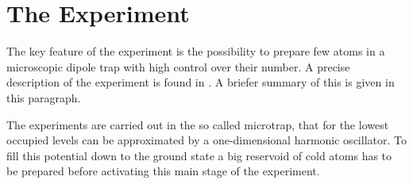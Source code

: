 \chapter{The Experiment}


The key feature of the experiment is the possibility to prepare few atoms in a microscopic dipole trap with high control over their number. A precise description of the experiment is found in \cite{friedhelm}. A briefer summary of this is given in this paragraph.

The experiments are carried out in the so called microtrap, that for the lowest occupied levels can be approximated by a one-dimensional harmonic oscillator. To fill this potential down to the ground state a big reservoid of cold atoms has to be prepared before activating this main stage of the experiment.

